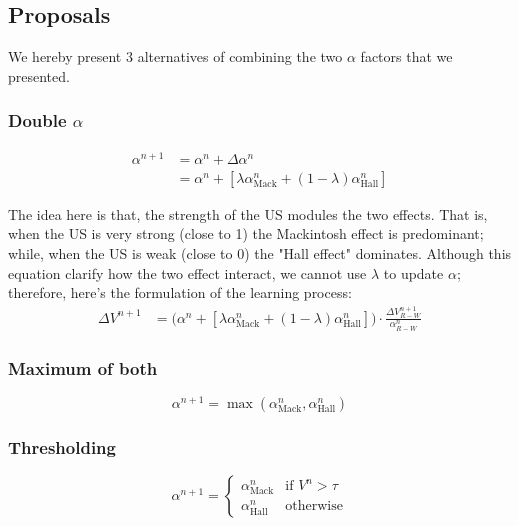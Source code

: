 \documentclass[11pt,a4paper]{article}
\newcommand{\alphamack}{\alpha _{\text{Mack}}}
\newcommand{\alphahall}{\alpha _{\text{Hall}}}
\begin{document}
\subsection{Proposals}

We hereby present 3 alternatives of combining the two $\alpha$ factors that we presented.

\subsubsection{Double $\alpha$}
\begin{equation}
	\begin{aligned}
		\alpha ^{n + 1}
			&= \alpha ^n + \Delta \alpha ^n \\
			&= \alpha ^n + \left[ \lambda \alphamack ^n + (1 - \lambda) \alphahall ^n \right] 
	\end{aligned}
\end{equation}

The idea here is that, the strength of the US modules the two effects. That is, when the US is very strong (close to 1) the Mackintosh effect is predominant; while, when the US is weak (close to 0) the "Hall effect" dominates. Although this equation clarify how the two effect interact, we cannot use $\lambda$ to update $\alpha$; therefore, here's the formulation of the learning process:
\begin{equation}
    \begin{aligned}
    \Delta V^{n+1} &= \big( \alpha ^n + \left[ \lambda \alphamack ^n + (1 - \lambda) \alphahall ^n \right] \big) \cdot \frac{\Delta V^{n+1}_{R-W}}{\alpha^n_{R-W}}
    \end{aligned}
\end{equation}

\subsubsection{Maximum of both}

\begin{equation}
	\alpha ^{n + 1} = \max { \left( \alphamack ^n, \alphahall ^n \right) } 
\end{equation}

\subsubsection{Thresholding}

\begin{equation}
	\alpha ^{n + 1} = \begin{cases}
		\alphamack ^n & \text{if } V^n > \tau \\
		\alphahall ^n & \text{otherwise}
	\end{cases}
\end{equation}
\end{document}
